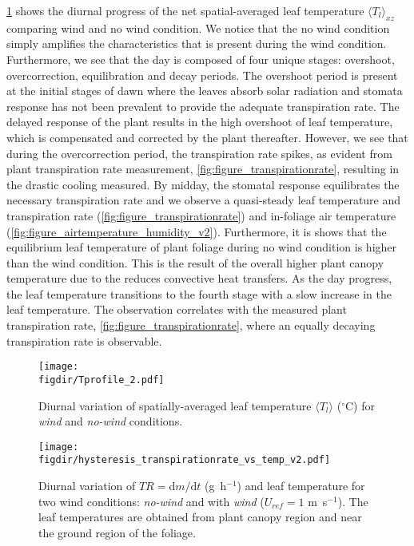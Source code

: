 \cref{fig:Tprofile_2} shows the diurnal progress of the net spatial-averaged leaf temperature $\langle T_l \rangle_{xz}$ comparing wind and no wind condition. We notice that the no wind condition simply amplifies the characteristics that is present during the wind condition. Furthermore, we see that the day is composed of four unique stages: overshoot, overcorrection, equilibration and decay periods. The overshoot period is present at the initial stages of dawn where the leaves absorb solar radiation and stomata response has not been prevalent to provide the adequate transpiration rate. The delayed response of the plant results in the high overshoot of leaf temperature, which is compensated and corrected by the plant thereafter. However, we see that during the overcorrection period, the transpiration rate spikes, as evident from plant transpiration rate measurement, \cref{fig:figure_transpirationrate}, resulting in the drastic cooling measured. By midday, the stomatal response equilibrates the necessary transpiration rate and we observe a quasi-steady leaf temperature and transpiration rate (\cref{fig:figure_transpirationrate}) and in-foliage air temperature (\cref{fig:figure_airtemperature_humidity_v2}). Furthermore, it is shows that the equilibrium leaf temperature of plant foliage during no wind condition is higher than the wind condition. This is the result of the overall higher plant canopy temperature due to the reduces convective heat transfers. As the day progress, the leaf temperature transitions to the fourth stage with a slow increase in the leaf temperature. The observation correlates with the measured plant transpiration rate, \cref{fig:figure_transpirationrate}, where an equally decaying transpiration rate is observable. 

	\begin{figure}[t]
	\centering
	\texttt{[image: \\figdir/Tprofile\_2.pdf]}
	\caption{Diurnal variation of spatially-averaged leaf temperature $\langle T_l \rangle$ ($^{\circ}$C) for \textit{wind} and \textit{no-wind} conditions.}
	\label{fig:Tprofile_2}
	\end{figure}

	\begin{figure}[t]
	\centering
	\texttt{[image: \\figdir/hysteresis\_transpirationrate\_vs\_temp\_v2.pdf]}
	\caption{Diurnal variation of $TR=\mathrm{d}m/\mathrm{d}t$ (g~h$^{-1}$) and leaf temperature for two wind conditions:   \textit{no-wind} and   with \textit{wind} ($U_{ref}=1$ m~s$^{-1}$). The leaf temperatures are obtained from  plant canopy region and   near the ground region of the foliage.}
	\label{fig:hysteresis_transpirationrate_vs_temp_v2}
	\end{figure}

